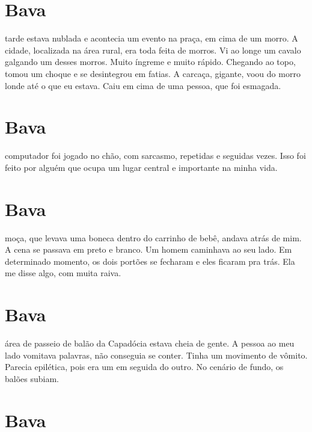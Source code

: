 \chapter*{Bava \smallskip{}}

 tarde estava nublada e acontecia um evento na praça, em cima de um morro. A cidade, localizada na área rural, era toda feita de morros. Vi ao longe um cavalo galgando um desses morros. Muito íngreme e muito rápido. Chegando ao topo, tomou um choque e se desintegrou em fatias. A carcaça, gigante, voou do morro londe até o que eu estava. Caiu em cima de uma pessoa, que foi esmagada.

\chapter*{Bava \smallskip{}}

 computador foi jogado no chão, com sarcasmo, repetidas e seguidas vezes. Isso foi feito por alguém que ocupa um lugar central e importante na minha vida.

\chapter*{Bava \smallskip{}}

 moça, que levava uma boneca dentro do carrinho de bebê, andava atrás de mim. A cena se passava em preto e branco. Um homem caminhava ao seu lado. Em determinado momento, os dois portões se fecharam e eles ficaram pra trás. Ela me disse algo, com muita raiva.

\chapter*{Bava \smallskip{}}

 área de passeio de balão da Capadócia estava cheia de gente. A pessoa ao meu lado vomitava palavras, não conseguia se conter. Tinha um movimento de vômito. Parecia epilética, pois era um em seguida do outro. No cenário de fundo, os balões subiam.

\chapter*{Bava \smallskip{}}

